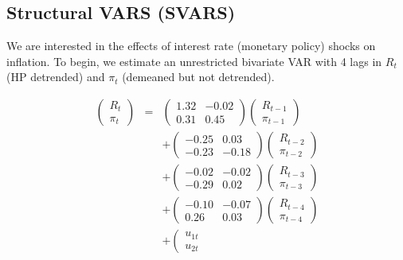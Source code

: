 \documentclass[authoryear,11pt]{elsarticle}
\begin{document}
\subsection{Structural VARS (SVARS)}
We are interested in the effects of interest rate (monetary policy) shocks on inflation. To begin, we estimate an unrestricted bivariate VAR with 4 lags in $R_{t}$ (HP detrended) and $\pi _{t}$ (demeaned but not detrended).

\begin{eqnarray*}
\left( 
\begin{array}{c}
R_{t} \\ 
\pi _{t}
\end{array}
\right) &=&\left( 
\begin{array}{cc}
1.32 & -0.02 \\ 
0.31 & 0.45
\end{array}
\right) \left( 
\begin{array}{c}
R_{t-1} \\ 
\pi _{t-1}
\end{array}
\right) \\
&&+\left( 
\begin{array}{cc}
-0.25 & 0.03 \\ 
-0.23 & -0.18
\end{array}
\right) \left( 
\begin{array}{c}
R_{t-2} \\ 
\pi _{t-2}
\end{array}
\right) \\
&&+\left( 
\begin{array}{cc}
-0.02 & -0.02 \\ 
-0.29 & 0.02
\end{array}
\right) \left( 
\begin{array}{c}
R_{t-3} \\ 
\pi _{t-3}
\end{array}
\right) \\
&&+\left( 
\begin{array}{cc}
-0.10 & -0.07 \\ 
0.26 & 0.03
\end{array}
\right) \left( 
\begin{array}{c}
R_{t-4} \\ 
\pi _{t-4}
\end{array}
\right) \\
&&+\left( 
\begin{array}{c}
u_{1t} \\ 
u_{2t}
\end{array}

\end{eqnarray*}
\end{document}
